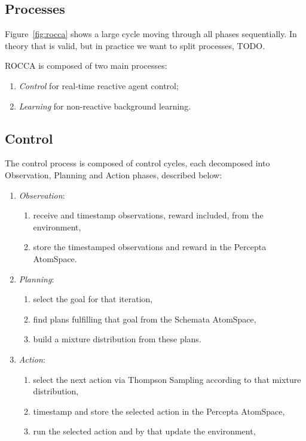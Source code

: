 \documentclass[runningheads]{llncs}
\begin{document}
\subsection{Processes}

Figure~\ref{fig:rocca} shows a large cycle moving through all phases
sequentially.  In theory that is valid, but in practice we want to
split processes, TODO.

ROCCA is composed of two main processes:
\begin{enumerate}
\item \emph{Control} for real-time reactive agent control;
\item \emph{Learning} for non-reactive background learning.
\end{enumerate}

\subsection{Control}
The control process is composed of control cycles, each decomposed
into Observation, Planning and Action phases, described below:
\begin{enumerate}
\item \emph{Observation}:
  \begin{enumerate}
  \item receive and timestamp observations, reward included, from the
    environment,
  \item store the timestamped observations and reward in the Percepta
    AtomSpace.
  \end{enumerate}
\item \emph{Planning}:
  \begin{enumerate}
  \item select the goal for that iteration,
  \item find plans fulfilling that goal from the Schemata AtomSpace,
  \item build a mixture distribution from these plans.
  \end{enumerate}
\item \emph{Action}:
  \begin{enumerate}
  \item select the next action via Thompson Sampling according to that
    mixture distribution,
  \item timestamp and store the selected action in the Percepta
    AtomSpace,
  \item run the selected action and by that update the environment,
  \end{enumerate}
\end{enumerate}
\end{document}
